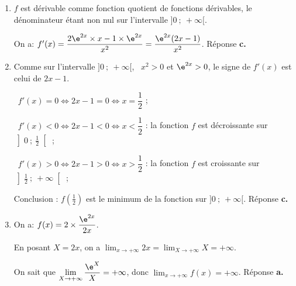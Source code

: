 \begin{enumerate}
\item %
$f$ est dérivable comme fonction quotient de fonctions dérivables, le dénominateur étant non nul sur l'intervalle $]0~;~+\infty[$.

On a: $f'(x) = \dfrac{2\e^{2x} \times x - 1 \times \e^{2x}}{x^2} = \dfrac{\e^{2x}(2x - 1)}{x^2}$. \hfill{}Réponse \textbf{c.}

\item Comme sur l'intervalle $]0~;~+\infty[$, \, $x^2 > 0$ et $\e^{2x} > 0$, le signe de $f'(x)$ est celui de $2x - 1$.

\starredbullet~$f'(x)  = 0 \iff 2x - 1 = 0 \iff x = \dfrac{1}{2}$ ;

\starredbullet~$f'(x)  < 0 \iff 2x - 1 < 0 \iff x < \dfrac{1}{2}$ : la fonction $f$ est décroissante sur $\left]0~;~\frac{1}{2}\right[$ ;

\starredbullet~$f'(x)  > 0 \iff 2x - 1 > 0 \iff x > \dfrac{1}{2}$ : la fonction $f$ est croissante sur $\left]\frac{1}{2}~;~+ \infty\right[$ ;

Conclusion : $f\left(\frac{1}{2}\right)$ est le minimum de la fonction sur $]0~;~+ \infty[$.  
\hfill{}Réponse \textbf{c.}

\item   On a: $f(x) = 2 \times \dfrac{\e^{2x}}{2x}$.

En posant $X = 2x$, on a $\displaystyle\lim_{x \to + \infty} 2x = \displaystyle\lim_{X \to + \infty} X = + \infty$.

On sait que $\displaystyle\lim_{X \to + \infty} \dfrac{\e^X}{X} = + \infty$, donc $\displaystyle\lim_{x \to + \infty} f(x) = + \infty$. \hfill{}Réponse \textbf{a.}


\end{enumerate}
